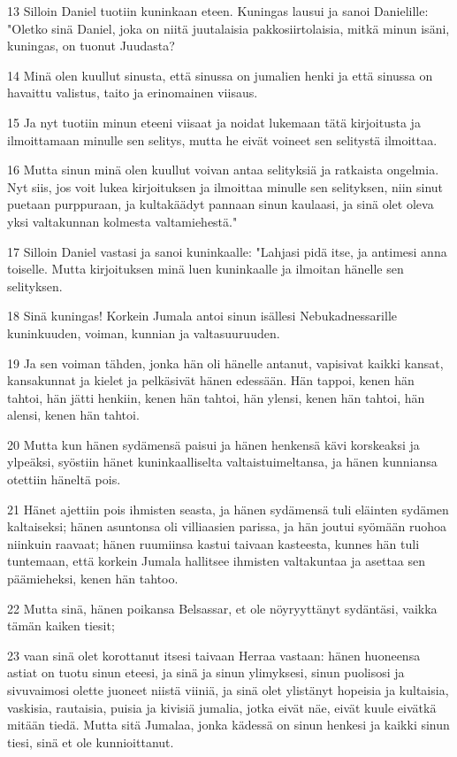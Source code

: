 \par 13 Silloin Daniel tuotiin kuninkaan eteen. Kuningas lausui ja sanoi Danielille: "Oletko sinä Daniel, joka on niitä juutalaisia pakkosiirtolaisia, mitkä minun isäni, kuningas, on tuonut Juudasta?
\par 14 Minä olen kuullut sinusta, että sinussa on jumalien henki ja että sinussa on havaittu valistus, taito ja erinomainen viisaus.
\par 15 Ja nyt tuotiin minun eteeni viisaat ja noidat lukemaan tätä kirjoitusta ja ilmoittamaan minulle sen selitys, mutta he eivät voineet sen selitystä ilmoittaa.
\par 16 Mutta sinun minä olen kuullut voivan antaa selityksiä ja ratkaista ongelmia. Nyt siis, jos voit lukea kirjoituksen ja ilmoittaa minulle sen selityksen, niin sinut puetaan purppuraan, ja kultakäädyt pannaan sinun kaulaasi, ja sinä olet oleva yksi valtakunnan kolmesta valtamiehestä."
\par 17 Silloin Daniel vastasi ja sanoi kuninkaalle: "Lahjasi pidä itse, ja antimesi anna toiselle. Mutta kirjoituksen minä luen kuninkaalle ja ilmoitan hänelle sen selityksen.
\par 18 Sinä kuningas! Korkein Jumala antoi sinun isällesi Nebukadnessarille kuninkuuden, voiman, kunnian ja valtasuuruuden.
\par 19 Ja sen voiman tähden, jonka hän oli hänelle antanut, vapisivat kaikki kansat, kansakunnat ja kielet ja pelkäsivät hänen edessään. Hän tappoi, kenen hän tahtoi, hän jätti henkiin, kenen hän tahtoi, hän ylensi, kenen hän tahtoi, hän alensi, kenen hän tahtoi.
\par 20 Mutta kun hänen sydämensä paisui ja hänen henkensä kävi korskeaksi ja ylpeäksi, syöstiin hänet kuninkaalliselta valtaistuimeltansa, ja hänen kunniansa otettiin häneltä pois.
\par 21 Hänet ajettiin pois ihmisten seasta, ja hänen sydämensä tuli eläinten sydämen kaltaiseksi; hänen asuntonsa oli villiaasien parissa, ja hän joutui syömään ruohoa niinkuin raavaat; hänen ruumiinsa kastui taivaan kasteesta, kunnes hän tuli tuntemaan, että korkein Jumala hallitsee ihmisten valtakuntaa ja asettaa sen päämieheksi, kenen hän tahtoo.
\par 22 Mutta sinä, hänen poikansa Belsassar, et ole nöyryyttänyt sydäntäsi, vaikka tämän kaiken tiesit;
\par 23 vaan sinä olet korottanut itsesi taivaan Herraa vastaan: hänen huoneensa astiat on tuotu sinun eteesi, ja sinä ja sinun ylimyksesi, sinun puolisosi ja sivuvaimosi olette juoneet niistä viiniä, ja sinä olet ylistänyt hopeisia ja kultaisia, vaskisia, rautaisia, puisia ja kivisiä jumalia, jotka eivät näe, eivät kuule eivätkä mitään tiedä. Mutta sitä Jumalaa, jonka kädessä on sinun henkesi ja kaikki sinun tiesi, sinä et ole kunnioittanut.
